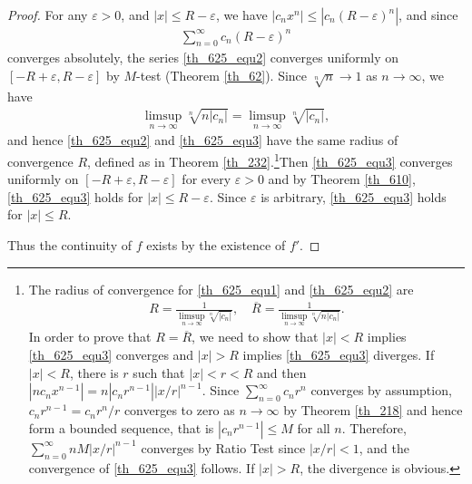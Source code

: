 \documentclass[11pt]{book}
\theoremstyle{definition}
\numberwithin{equation}{chapter}
\begin{document}
\begin{proof}
For any $\varepsilon > 0$, and $\left|x\right| \leq R - \varepsilon$, we have $\left|c_nx^n\right| \leq \left|c_n(R - \varepsilon)^n\right|$, and since
\begin{align*}
    \sum^\infty_{n=0} c_n(R - \varepsilon)^n
\end{align*}
converges absolutely, the series \eqref{th_625_equ2} converges uniformly on $[-R + \varepsilon, R - \varepsilon]$ by $M$-test (Theorem \ref{th_62}). Since $\sqrt[n]{n} \to 1$ as $n \to \infty$, we have
\begin{align*}
    \limsup_{n\to\infty} \sqrt[n]{n\left|c_n\right|} = \limsup_{n\to\infty} \sqrt[n]{\left|c_n\right|},
\end{align*}
and hence \eqref{th_625_equ2} and \eqref{th_625_equ3} have the same radius of convergence $R$, defined as in Theorem \ref{th_232}.\footnote{The radius of convergence for \eqref{th_625_equ1} and \eqref{th_625_equ2} are
\begin{align*}
    R = \frac{1}{\limsup_{n\to\infty} \sqrt[n]{\left|c_n\right|}}, \quad \overline{R} = \frac{1}{\limsup_{n\to\infty} \sqrt[n]{n\left|c_n\right|}}.
\end{align*}
In order to prove that $R = \overline{R}$, we need to show that $\left|x\right| < R$ implies \eqref{th_625_equ3} converges and $\left|x\right| > R$ implies \eqref{th_625_equ3} diverges. If $\left|x\right| < R$, there is $r$ such that $\left|x\right| < r < R$ and then $\left|n c_n x^{n-1}\right| = n \left|c_n r^{n-1}\right| \left|x/r\right|^{n-1}$. Since $\sum^\infty_{n=0} c_n r^n$ converges by assumption, $c_n r^{n-1} = c_nr^n/r$ converges to zero as $n \to \infty$ by Theorem \ref{th_218} and hence form a bounded sequence, that is $\left|c_n r^{n-1}\right| \leq M$ for all $n$. Therefore, $\sum^\infty_{n=0} nM \left|x/r\right|^{n-1}$ converges by Ratio Test since $\left|x/r\right| < 1$, and the convergence of \eqref{th_625_equ3} follows. If $\left|x\right| > R$, the divergence is obvious.}Then \eqref{th_625_equ3} converges uniformly on $[-R + \varepsilon, R - \varepsilon]$ for every $\varepsilon > 0$ and by Theorem \ref{th_610}, \eqref{th_625_equ3} holds for $\left|x\right| \leq R - \varepsilon$. Since $\varepsilon$ is arbitrary, \eqref{th_625_equ3} holds for $\left|x\right| \leq R$. 

Thus the continuity of $f$ exists by the existence of $f'$.
\end{proof}

\medskip
\end{document}
